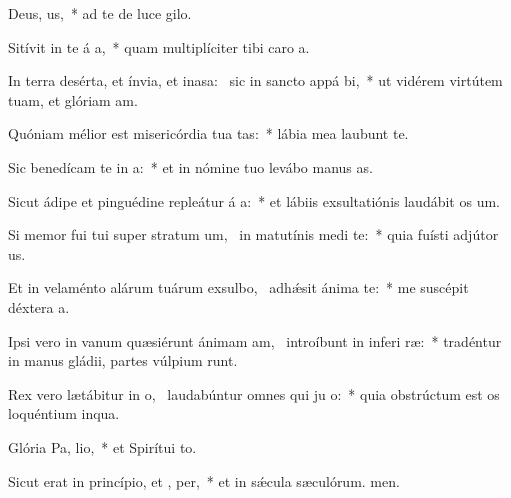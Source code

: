 \item Deus,  us,~* ad te de luce gilo.
\item Sitívit in te á a,~* quam multiplíciter tibi caro a.
\item In terra desérta, et ínvia, et inasa:~\pscross{} sic in sancto appá bi,~* ut vidérem virtútem tuam, et glóriam am.
\item Quóniam mélior est misericórdia tua  tas:~* lábia mea laubunt te.
\item Sic benedícam te in  a:~* et in nómine tuo levábo manus as.
\item Sicut ádipe et pinguédine repleátur á a:~* et lábiis exsultatiónis laudábit os um.
\item Si memor fui tui super stratum um,~\pscross{} in matutínis medi  te:~* quia fuísti adjútor us.
\item Et in velaménto alárum tuárum exsulbo,~\pscross{} adhǽsit ánima   te:~* me suscépit déxtera a.
\item Ipsi vero in vanum quæsiérunt ánimam am,~\pscross{} introíbunt in inferi ræ:~* tradéntur in manus gládii, partes vúlpium runt.
\item Rex vero lætábitur in o,~\pscross{} laudabúntur omnes qui ju  o:~* quia obstrúctum est os loquéntium inqua.
\item Glória Pa,  lio,~* et Spirítui to.
\item Sicut erat in princípio, et ,  per,~* et in sǽcula sæculórum. men.

